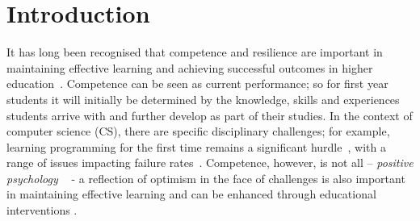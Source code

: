 \documentclass[sigconf]{acmart}
\begin{document}
%
\maketitle

\section{Introduction}
It has long been recognised that competence and resilience are important in maintaining effective learning and achieving successful outcomes in higher education~\cite{Marsten95,Walker2006,Holdsworth2018}. Competence can be seen as current performance; so for first year students it will initially be determined by the knowledge, skills and experiences students arrive with and further develop as part of their studies. In the context of computer science (CS), there are specific disciplinary challenges; for example, learning programming for the first time remains a significant hurdle~\cite{davenport-et-al:latice2016,murphy-et-al:programming2017,simon-et-al:sigcse2018}, with a range of issues impacting failure rates~\cite{Porter:2013:HFR:2445196.2445250,Watson:2014:FRI:2591708.2591749}. Competence, however, is not all -- \textit{positive psychology ~\cite{Seligman90}} - a reflection of optimism in the face of challenges is also important in maintaining effective learning and can be enhanced through educational interventions \cite{Walker2006,Holdsworth2018}.

\end{document}
